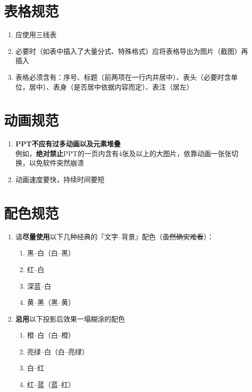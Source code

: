 \section[表格规范]{表格规范}
\begin{enumerate}
    \item 应使用三线表
    \item 必要时（如表中插入了大量分式、特殊格式）应将表格导出为图片（截图）再插入
    \item 表格必须含有：序号、标题（前两项在一行内并居中）、表头（必要时含单位，居中）、表身（是否居中依据内容而定）、表注（居左）
\end{enumerate}

\section[动画规范]{动画规范}
\begin{enumerate}
    \item \textbf{PPT不应有过多动画以及元素堆叠}\\
          例如，\textbf{绝对禁止}PPT的一页内含有4张及以上的大图片，依靠动画一张张切换，以免软件突然崩溃
    \item 动画速度要快，持续时间要短
\end{enumerate}

\section[配色规范]{配色规范}
\begin{enumerate}
    \item 请\textbf{尽量使用}以下几种经典的『文字--背景』配色（\st{虽然确实难看}）：
          \begin{enumerate}
              \item 黑--白（白--黑）
              \item 红--白
              \item 深蓝--白
              \item 黄--黑（黑--黄）
          \end{enumerate}
    \item \textbf{忌用}以下投影后效果一塌糊涂的配色
          \begin{enumerate}
              \item 橙--白（白--橙）
              \item 亮绿--白（白--亮绿）
              \item 白--红
              \item 红--蓝（蓝--红）
          \end{enumerate}
\end{enumerate}

